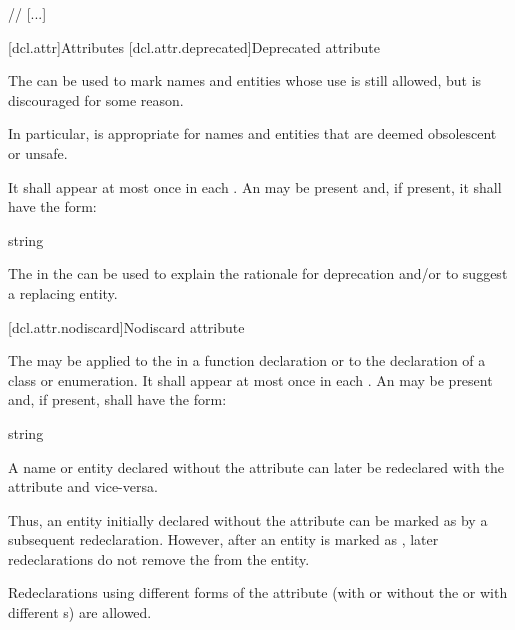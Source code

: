 \documentclass{wg21}
\begin{document}
// [...]

[dcl.attr]{Attributes}%
[dcl.attr.deprecated]{Deprecated attribute}%

\pnum
The   can be used to mark names and entities
whose use is still allowed, but is discouraged for some reason.
\begin{note}
    In particular,
     is appropriate for names and entities that are deemed obsolescent or
    unsafe.
\end{note}
It shall appear at most once in each . An
 may be present and, if present, it shall have the form:

\begin{ncbnf}
    \terminal{(} string \terminal{)}
\end{ncbnf}

\begin{note}
    The  in the 
    can be used to explain the rationale for deprecation and/or to suggest a replacing entity.
\end{note}

[dcl.attr.nodiscard]{Nodiscard attribute}%

\pnum
The  
may be applied to the 
in a function declaration or to the declaration of a class or enumeration.
It shall appear at most once in each .
An  may be present
and, if present, shall have the form:

\begin{ncbnf}
    \terminal{(} string \terminal{)}
\end{ncbnf}

\pnum
A name or entity declared without the  attribute
can later be redeclared with the attribute and vice-versa.
\begin{note}
    Thus, an entity initially declared without the attribute
    can be marked as 
    by a subsequent redeclaration.
    However, after an entity is marked as ,
    later redeclarations do not remove the 
    from the entity.
\end{note}
Redeclarations using different forms of the attribute
(with or without the 
or with different s)
are allowed.
\end{document}
